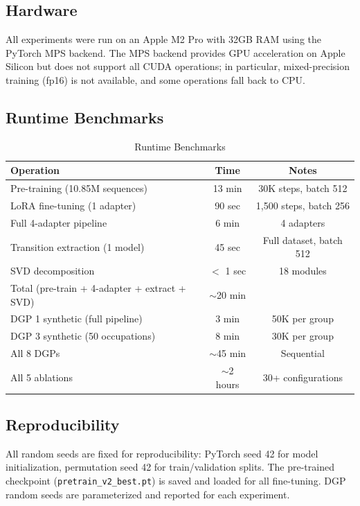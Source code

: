 \documentclass[12pt]{article}
\begin{document}
\subsection{Hardware}

All experiments were run on an Apple M2 Pro with 32GB RAM using the PyTorch MPS backend. The MPS backend provides GPU acceleration on Apple Silicon but does not support all CUDA operations; in particular, mixed-precision training (fp16) is not available, and some operations fall back to CPU.

\subsection{Runtime Benchmarks}

\begin{table}[H]
\centering
\caption{Runtime Benchmarks}
\label{tab:runtime}
\begin{tabular}{lcc}
\toprule
Operation & Time & Notes \\
\midrule
Pre-training (10.85M sequences) & 13 min & 30K steps, batch 512 \\
LoRA fine-tuning (1 adapter) & 90 sec & 1,500 steps, batch 256 \\
Full 4-adapter pipeline & 6 min & 4 adapters \\
Transition extraction (1 model) & 45 sec & Full dataset, batch 512 \\
SVD decomposition & $<$ 1 sec & 18 modules \\
\midrule
Total (pre-train + 4-adapter + extract + SVD) & $\sim$20 min & \\
\midrule
DGP 1 synthetic (full pipeline) & 3 min & 50K per group \\
DGP 3 synthetic (50 occupations) & 8 min & 30K per group \\
All 8 DGPs & $\sim$45 min & Sequential \\
All 5 ablations & $\sim$2 hours & 30+ configurations \\
\bottomrule
\end{tabular}
\end{table}

\subsection{Reproducibility}

All random seeds are fixed for reproducibility: PyTorch seed 42 for model initialization, permutation seed 42 for train/validation splits. The pre-trained checkpoint (\texttt{pretrain\_v2\_best.pt}) is saved and loaded for all fine-tuning. DGP random seeds are parameterized and reported for each experiment.
\end{document}
